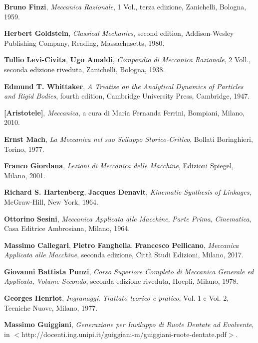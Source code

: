 \begin{thebibliography}{99}
\thispagestyle{empty}
 {\bfseries Bruno Finzi}, 
	{\em Meccanica Razionale},
	1 Vol.,
	terza edizione, Zanichelli, Bologna, 1959. 

 {\bfseries Herbert Goldstein}, 
		{\em Classical Mechanics}, 
	 second edition, Addison-Wesley Publishing Company, Reading,
	Massachusetts, 1980.

 {\bfseries Tullio Levi-Civita}, {\bfseries Ugo Amaldi}, 
	{\em Compendio di Meccanica Razionale}, 2 Voll.,
	seconda edizione riveduta, Zanichelli, Bologna, 1938.

 {\bfseries Edmund T. Whittaker}, 
	{\em A Treatise on the Analytical Dynamics of Particles and Rigid Bodies},
	fourth edition, Cambridge University Press, Cambridge, 1947.

 {\bfseries [Aristotele]},
		{\em Meccanica},
		 a cura di Maria Fernanda Ferrini,
		Bompiani, Milano, 2010.

 {\bfseries Ernst Mach}, 
	{\em La Meccanica nel suo Sviluppo Storico-Critico},
	Bollati Boringhieri, Torino, 1977. 

 {\bfseries Franco Giordana}, 
	{\em Lezioni di Meccanica delle Macchine},
	Edizioni Spiegel, Milano, 2001. 

 {\bfseries Richard S. Hartenberg}, {\bfseries Jacques
 Denavit},
        {\em Kinematic Synthesis of Linkages},
        McGraw-Hill, New York, 1964.

 {\bfseries Ottorino Sesini},
	{\em Meccanica Applicata alle Macchine},
	{\em Parte Prima}, {\em Cinematica},
	Casa Editrice Ambrosiana, Milano, 1964.	

 {\bfseries Massimo Callegari},
	{\bfseries Pietro Fanghella}, {\bfseries Francesco Pellicano},
	{\em Meccanica Applicata alle Macchine},
	seconda edizione, Citt\`a Studi Edizioni, Milano, 2017.

 {\bfseries Giovanni Battista Punzi},
	{\em Corso Superiore Completo di Meccanica Generale ed Applicata},
	{\em Volume Secondo},
	seconda edizione riveduta, Hoepli, Milano, 1978.

 {\bfseries Georges Henriot},
	{\em Ingranaggi}. {\em Trattato teorico e pratico}, Vol. 1 e Vol. 2,
	Tecniche Nuove, Milano, 1977.

 {\bfseries Massimo Guiggiani},
	{\em Generazione per Inviluppo di Ruote Dentate ad Evolvente},
 in $<$http://docenti.ing.unipi.it/guiggiani-m/guiggiani-ruote-dentate.pdf$>$.


\end{thebibliography}
